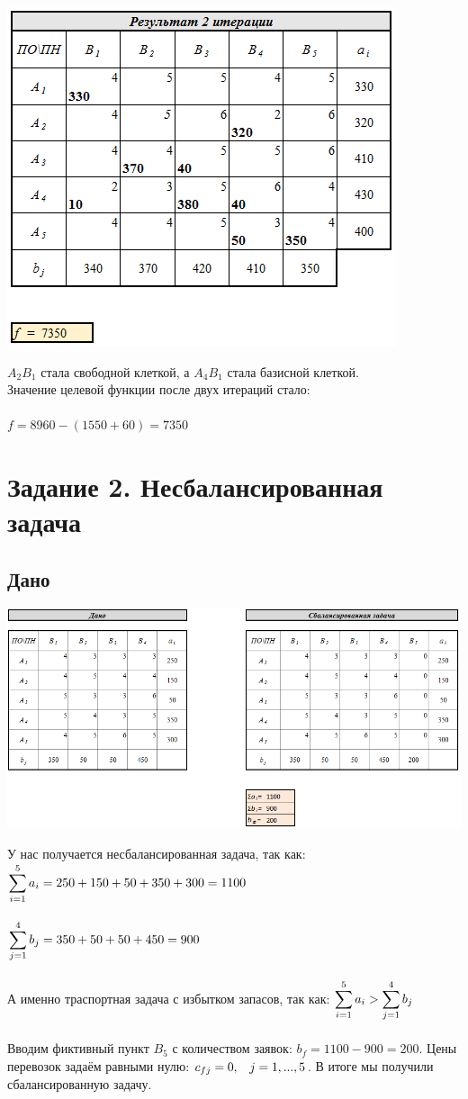 \documentclass[14pt,a4paper,fleqn]{extarticle}
\begin{document}
\begin{center}
	\includegraphics[scale=0.5]{19}
\end{center}
$A_2B_1$ стала свободной клеткой, а $A_4B_1$ стала базисной клеткой.\\
Значение целевой функции после двух итераций стало:\\\\
$f = 8960-(1550+60) = 7350$
\newpage
\section*{Задание 2. Несбалансированная задача}
\subsection*{Дано}
\begin{center}
	\includegraphics[scale=0.5]{20}
\end{center}
У нас получается несбалансированная задача, так как:\\
$\smashoperator[r]{\sum_{i=1}^{5}} a_i = 250+150+50+350+300 = 1100$\\\\
$\smashoperator[r]{\sum_{j=1}^{4}} b_j = 350+50+50+450 = 900$\\\\
А именно траспортная задача с избытком запасов, так как: $\smashoperator[r]{\sum_{i=1}^{5}} a_i > \smashoperator[r]{\sum_{j=1}^{4}} b_j$\\\\
Вводим фиктивный пункт $B_5$ с количеством заявок: $b_f = 1100 - 900 = 200$. Цены перевозок задаём равными нулю: $c_{fj} = 0, \hspace*{0.3cm} j = 1,...,5$. В итоге мы получили сбалансированную задачу.
\newpage
\end{document}
